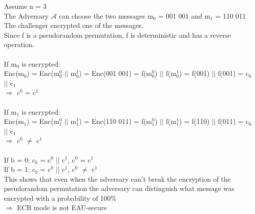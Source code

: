 Assume n = 3 \\
The Adversary  \(\mathcal{A}\) can choose the two messages m\(_{0}\)  = 001 001 and  m\(_{1}\)  = 110 011 \\
The challenger encrypted one of the messages. \\
Since f is a pseudorandom permutation, f is deterministic and has a reverse operation. \\
\\
If m\(_{0}\)  is encrypted: \\
\>Enc(m\(_{0}\)) = Enc(m\(_{0}^{0}\) \(\vert \vert\) m\(_{0}^{1}\)) = Enc(001 001) = f(m\(_{0}^{0}\)) \(\vert \vert\) f(m\(_{0}^{1}\)) =
f(001) \(\vert \vert\) f(001) = c\(_{0}\) \(\vert \vert\) c\(_{1}\) \\
\>\(\Rightarrow\) c\(^{0}\) = c\(^{1}\) \\
\\
If m\(_{1}\)  is encrypted: \\
\>Enc(m\(_{1}\)) = Enc(m\(_{1}^{0}\) \(\vert \vert\) m\(_{1}^{1}\)) = Enc(110 011) = f(m\(_{1}^{0}\)) \(\vert \vert\) f(m\(_{1}^{1}\)) =
f(110) \(\vert \vert\) f(011) = c\(_{0}\) \(\vert \vert\) c\(_{1}\) \\
\>\(\Rightarrow\) c\(^{0}\) \(\neq\) c\(^{1}\) \\
\\
If b = 0: c\(_{b}\) = c\(^{0}\) \(\vert \vert\) c\(^{1}\), c\(^{0}\) = c\(^{1}\) \\
If b = 1: c\(_{b}\) = c\(^{0}\) \(\vert \vert\) c\(^{1}\), c\(^{0}\) \(\neq\) c\(^{1}\) \\
This shows that even when the adversary can't break the encryption of the pseudorandom permutation the adversary can distinguish what message was encrypted with a probability of 100\(\%\) \\
\(\Rightarrow\) ECB mode is not EAU-secure \\
  